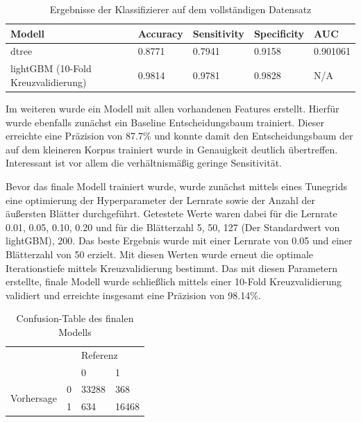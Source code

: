 \begin{table}
    \begin{center}
        \begin{tabularx}{\textwidth}{XXXXX}
            \toprule
            Modell & Accuracy & Sensitivity & Specificity & AUC\\
            \midrule
            dtree & 0.8771 & 0.7941 & 0.9158 & 0.901061 \\
            lightGBM (10-Fold Kreuzvalidierung) & 0.9814 & 0.9781 & 0.9828 & N/A \\
            \bottomrule
        \end{tabularx}
        \caption{Ergebnisse der Klassifizierer auf dem vollständigen Datensatz}
        \label{full-model}
    \end{center}
\end{table}

Im weiteren wurde ein Modell mit allen vorhandenen Features erstellt.
Hierfür wurde ebenfalls zunächst ein Baseline Entscheidungsbaum trainiert.
Dieser erreichte eine Präzision von 87.7\% und konnte damit den Entscheidungsbaum der auf dem kleineren Korpus trainiert wurde in Genauigkeit deutlich übertreffen.
Interessant ist vor allem die verhältnismäßig geringe Sensitivität.

Bevor das finale Modell trainiert wurde, wurde zunächst mittels eines Tunegrids eine optimierung der Hyperparameter der Lernrate sowie der Anzahl der äußersten Blätter durchgeführt.
Getestete Werte waren dabei für die Lernrate 0.01, 0.05, 0.10, 0.20 und für die Blätterzahl 5, 50, 127 (Der Standardwert von lightGBM), 200.
Das beste Ergebnis wurde mit einer Lernrate von 0.05 und einer Blätterzahl von 50 erzielt.
Mit diesen Werten wurde erneut die optimale Iterationstiefe mittels Kreuzvalidierung bestimmt.
Das mit diesen Parametern erstellte, finale Modell wurde schließlich mittels einer 10-Fold Kreuzvalidierung validiert und erreichte insgesamt eine Präzision von 98.14\%.


\begin{table}
    \begin{center}
        \begin{tabularx}{\textwidth}{XXXX}
            \toprule
            & & \multicolumn{2}{X}{Referenz}\\
            & & 0 & 1 \\
            \multirow{2}{*}{Vorhersage} & 0 & 33288 & 368 \\
            & 1 & 634 & 16468 \\\midrule
        \end{tabularx}
        \caption{Confusion-Table des finalen Modells}
        \label{confusion-table}
    \end{center}
\end{table}
